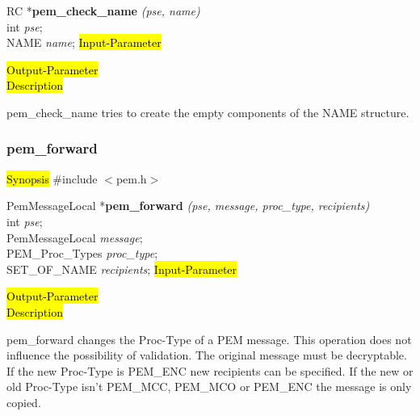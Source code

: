 RC *{\bf pem\_check\_name} {\em (pse, name)} \\
int {\em pse};\\
NAME {\em *name};
\hl{Input-Parameter}

\hl{Output-Parameter}
 \\
\hl{Description}

pem\_check\_name tries to create the empty components
of the NAME structure.







 

\subsubsection{pem\_forward}
\label{pem_forward}
\hl{Synopsis}
\#include $<$pem.h$>$ 

PemMessageLocal *{\bf pem\_forward} {\em (pse, message, proc\_type, recipients)} \\
int {\em pse};\\
PemMessageLocal {\em *message};\\
PEM\_Proc\_Types {\em proc\_type};\\
SET\_OF\_NAME {\em *recipients};
\hl{Input-Parameter}



\hl{Output-Parameter}
 \\
\hl{Description}

pem\_forward changes the Proc-Type of a PEM message. 
This operation does not influence the possibility of validation.
The original message must be decryptable.
If the new Proc-Type is PEM\_ENC new recipients can be specified.
If the new or old
Proc-Type isn't PEM\_MCC, PEM\_MCO or PEM\_ENC the message is only copied.





